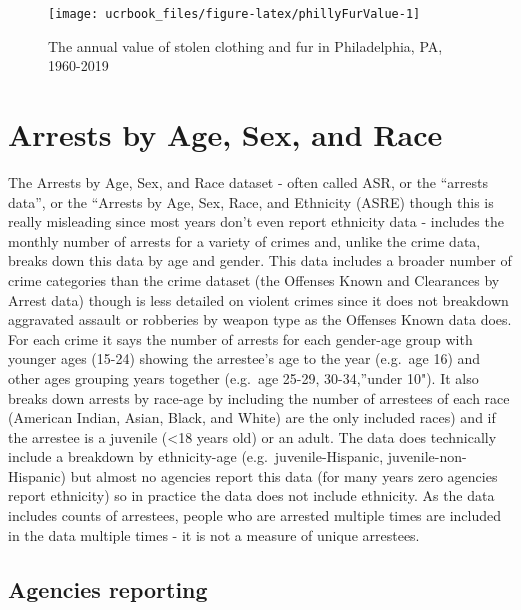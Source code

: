 \documentclass[
  12pt,
  openany]{book}
\begin{document}
\begin{figure}

{\centering \texttt{[image: ucrbook\_files/figure-latex/phillyFurValue-1]} 

}

\caption{The annual value of stolen clothing and fur in Philadelphia, PA, 1960-2019}\label{fig:phillyFurValue}
\end{figure}

\hypertarget{arrests}{%
\chapter{Arrests by Age, Sex, and Race}\label{arrests}}

The Arrests by Age, Sex, and Race dataset - often called ASR, or the ``arrests data'', or the ``Arrests by Age, Sex, Race, and Ethnicity (ASRE) though this is really misleading since most years don't even report ethnicity data - includes the monthly number of arrests for a variety of crimes and, unlike the crime data, breaks down this data by age and gender. This data includes a broader number of crime categories than the crime dataset (the Offenses Known and Clearances by Arrest data) though is less detailed on violent crimes since it does not breakdown aggravated assault or robberies by weapon type as the Offenses Known data does. For each crime it says the number of arrests for each gender-age group with younger ages (15-24) showing the arrestee's age to the year (e.g.~age 16) and other ages grouping years together (e.g.~age 25-29, 30-34,''under 10"). It also breaks down arrests by race-age by including the number of arrestees of each race (American Indian, Asian, Black, and White) are the only included races) and if the arrestee is a juvenile (\textless18 years old) or an adult. The data does technically include a breakdown by ethnicity-age (e.g.~juvenile-Hispanic, juvenile-non-Hispanic) but almost no agencies report this data (for many years zero agencies report ethnicity) so in practice the data does not include ethnicity. As the data includes counts of arrestees, people who are arrested multiple times are included in the data multiple times - it is not a measure of unique arrestees.

\hypertarget{agencies-reporting-2}{%
\section{Agencies reporting}\label{agencies-reporting-2}}
\end{document}
